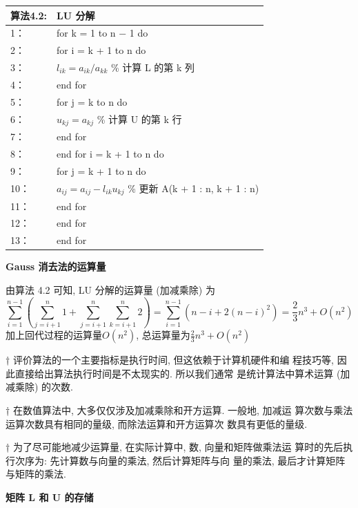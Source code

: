 \documentclass[12pt,a4paper]{article}
\begin{document}
\begin{table}  
	\begin{tabular*}{16cm}{ll}  
		\hline  
		算法4.2: &LU 分解 \\  
		\hline  
		1：   &for k = 1 to n − 1 do\\  
		2：   &\qquad for i = k + 1 to n do\\
		3：   &\qquad \qquad $l_{ik} = a_{ik}/a_{kk}$ \% 计算 L 的第 k 列\\
		4：   &\qquad end for\\
		5：   &\qquad for j = k to n do\\
		6：   &\qquad \qquad $u_{kj} = a_{kj}$ \% 计算 U 的第 k 行\\
		7：   &\qquad end for\\
		8：   &\qquad end for i = k + 1 to n do\\
		9：   & \qquad \qquad for j = k + 1 to n do\\
		10：   &\qquad \qquad \qquad $a_{ij}= a_{ij} − l_{ik}u_{kj}$ \% 更新 A(k + 1 : n, k + 1 : n)\\
		11：   &\qquad \qquad end for\\
		12：   &\qquad end for\\
		13：   &end for\\
		\hline  
	\end{tabular*}  
\end{table} 

{\bfseries Gauss 消去法的运算量}

由算法 4.2 可知, LU 分解的运算量 (加减乘除) 为
$$
\sum_{i=1}^{n-1}\left(\sum_{j=i+1}^{n} 1+\sum_{j=i+1}^{n} \sum_{k=i+1}^{n} 2\right)=\sum_{i=1}^{n-1}\left(n-i+2(n-i)^{2}\right)=\frac{2}{3} n^{3}+O\left(n^{2}\right)
$$
加上回代过程的运算量$O\left(n^{2}\right)$, 总运算量为$\frac{2}{3} n^{3}+O\left(n^{2}\right)$


† 评价算法的一个主要指标是执行时间, 但这依赖于计算机硬件和编
程技巧等, 因此直接给出算法执行时间是不太现实的. 所以我们通常
是统计算法中算术运算 (加减乘除) 的次数.



† 在数值算法中, 大多仅仅涉及加减乘除和开方运算. 一般地, 加减运
算次数与乘法运算次数具有相同的量级, 而除法运算和开方运算次
数具有更低的量级.



† 为了尽可能地减少运算量, 在实际计算中, 数, 向量和矩阵做乘法运
算时的先后执行次序为: 先计算数与向量的乘法, 然后计算矩阵与向
量的乘法, 最后才计算矩阵与矩阵的乘法.


{\bfseries 矩阵 L 和 U 的存储}
\end{document}
